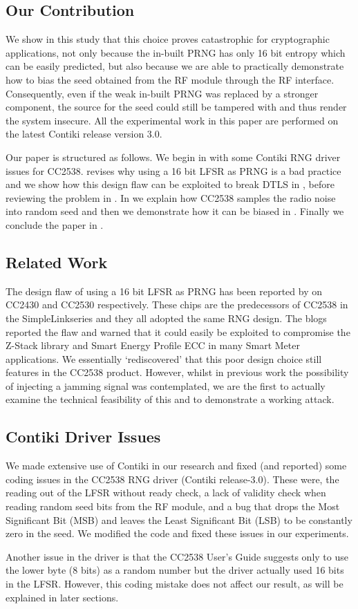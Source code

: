 \subsection{Our Contribution}
We show in this study that this choice proves catastrophic for cryptographic applications, not only because the in-built PRNG has only 16 bit entropy which can be easily predicted, but also because we are able to practically demonstrate how to bias the seed obtained from the RF module through the RF interface. Consequently, even if the weak in-built PRNG was replaced by a stronger component, the source for the seed could still be tampered with and thus render the system insecure. All the experimental work in this paper are performed on the latest Contiki release version 3.0.

Our paper is structured as follows. We begin in  with some Contiki RNG driver issues for CC2538.  revises why using a 16 bit LFSR as PRNG is a bad practice and we show how this design flaw can be exploited to break DTLS in , before reviewing the problem in . In  we explain how CC2538 samples the radio noise into random seed and then we demonstrate how it can be biased in . Finally we conclude the paper in .

\subsection{Related Work}
The design flaw of using a 16 bit LFSR as PRNG has been reported by \cite{SmartMeterBlog}\cite{CC2530PRNG} on CC2430\cite{CC2430Manual} and CC2530\cite{CC2530Manual} respectively. These chips are the predecessors of CC2538 in the SimpleLink\texttrademark  series and they all adopted the same RNG design. The blogs reported the flaw and warned that it could easily be exploited to compromise the Z-Stack library\cite{ZStack} and Smart Energy Profile ECC in many Smart Meter applications. We essentially `rediscovered' that this poor design choice still features in the CC2538 product. However, whilst in previous work the possibility of injecting a jamming signal was contemplated, we are the first to actually examine the technical feasibility of this and to demonstrate a working attack.

\subsection{Contiki Driver Issues}\label{ContikiDriverIssue}
We made extensive use of Contiki in our research and fixed (and reported) some coding issues in the CC2538 RNG driver (Contiki release-3.0). These were, the reading out of the LFSR without ready check, a lack of validity check when reading random seed bits from the RF module, and a bug that drops the Most Significant Bit (MSB) and leaves the Least Significant Bit (LSB) to be constantly zero in the seed.  We modified the code and fixed these issues in our experiments. 

Another issue in the driver is that the CC2538 User's Guide\cite{CC2538Manual} suggests only to use the lower byte (8 bits) as a random number but the driver actually used 16 bits in the LFSR. However, this coding mistake does not affect our result, as will be explained in  later sections.